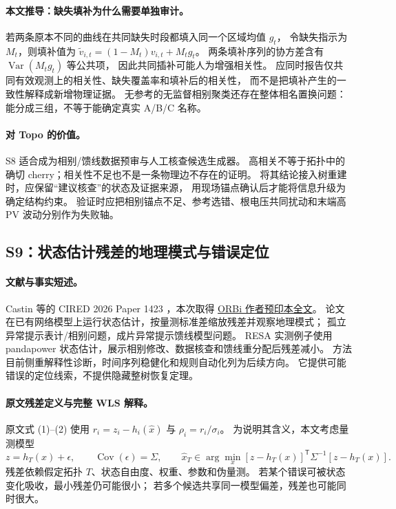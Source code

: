 \documentclass[UTF8,11pt,fontset=fandol]{ctexart}
\theoremstyle{remark}
\numberwithin{equation}{section}
\begin{document}
\paragraph{本文推导：缺失填补为什么需要单独审计。}
若两条原本不同的曲线在共同缺失时段都填入同一个区域均值 $g_t$，
令缺失指示为 $M_t$，则填补值为
$\widetilde v_{i,t}=(1-M_t)v_{i,t}+M_tg_t$。
两条填补序列的协方差含有 $\operatorname{Var}(M_tg_t)$ 等公共项，
因此共同插补可能人为增强相关性。
应同时报告仅共同有效观测上的相关性、缺失覆盖率和填补后的相关性，
而不是把填补产生的一致性解释成新增物理证据。
无参考的无监督相别聚类还存在整体相名置换问题：能分成三组，不等于能确定真实 A/B/C 名称。

\paragraph{对 Topo 的价值。}
S8 适合成为相别/馈线数据预审与人工核查候选生成器。
高相关不等于拓扑中的确切 cherry；相关性不足也不是一条物理边不存在的证明。
将其结论接入树重建时，应保留“建议核查”的状态及证据来源，
用现场锚点确认后才能将信息升级为确定结构约束。
验证时应把相别锚点不足、参考选错、根电压共同扰动和末端高 PV 波动分别作为失败轴。

\subsection{S9：状态估计残差的地理模式与错误定位}
\label{subsec:S9}

\paragraph{文献与事实短述。}
Castin 等的 CIRED 2026 Paper 1423 \citep{S9}，本次取得
\href{https://orbi.uliege.be/bitstream/2268/342287/1/Fullpaper_Theme2_1423_Castin.pdf}{ORBi 作者预印本全文}。
论文在已有网络模型上运行状态估计，按量测标准差缩放残差并观察地理模式；
孤立异常提示表计/相别问题，成片异常提示馈线模型问题。
RESA 实测例子使用 pandapower 状态估计，展示相别修改、数据核查和馈线重分配后残差减小。
方法目前侧重解释性诊断，时间序列稳健化和规则自动化列为后续方向。
它提供可能错误的定位线索，不提供隐藏整树恢复定理。

\paragraph{原文残差定义与完整 WLS 解释。}
原文式 (1)--(2) 使用 $r_i=z_i-h_i(\widehat x)$ 与 $\rho_i=r_i/\sigma_i$。
为说明其含义，本文考虑量测模型
\begin{equation}
 z=h_T(x)+\epsilon,\qquad \operatorname{Cov}(\epsilon)=\Sigma,
 \qquad
 \widehat x_T\in\arg\min_x
 [z-h_T(x)]^{\mathsf T}\Sigma^{-1}[z-h_T(x)].
 \label{eq:eng-s9-wls}
\end{equation}
残差依赖假定拓扑 $T$、状态自由度、权重、参数和伪量测。
若某个错误可被状态变化吸收，最小残差仍可能很小；
若多个候选共享同一模型偏差，残差也可能同时很大。
\end{document}
